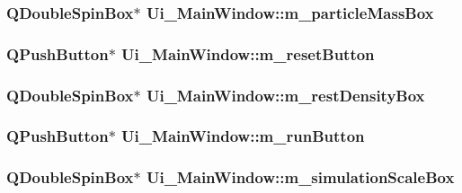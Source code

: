 \label{classUi__MainWindow_a63b4ccd5fefd7242fde139d0ced35e24}
\hypertarget{classUi__MainWindow_a7e35e693ba29d63bbcd1d01556282798}{
\subsubsection[{m\_\-particleMassBox}]{\setlength{\rightskip}{0pt plus 5cm}QDoubleSpinBox$\ast$ {\bf Ui\_\-MainWindow::m\_\-particleMassBox}}}
\label{classUi__MainWindow_a7e35e693ba29d63bbcd1d01556282798}
\hypertarget{classUi__MainWindow_a5caf92edd8ee08153a3d67dd2718429e}{
\subsubsection[{m\_\-resetButton}]{\setlength{\rightskip}{0pt plus 5cm}QPushButton$\ast$ {\bf Ui\_\-MainWindow::m\_\-resetButton}}}
\label{classUi__MainWindow_a5caf92edd8ee08153a3d67dd2718429e}
\hypertarget{classUi__MainWindow_a7ff20accfdc12db98eeeceaf1bd145b4}{
\subsubsection[{m\_\-restDensityBox}]{\setlength{\rightskip}{0pt plus 5cm}QDoubleSpinBox$\ast$ {\bf Ui\_\-MainWindow::m\_\-restDensityBox}}}
\label{classUi__MainWindow_a7ff20accfdc12db98eeeceaf1bd145b4}
\hypertarget{classUi__MainWindow_a4c6abf58735917e5f2a72face76cbc41}{
\subsubsection[{m\_\-runButton}]{\setlength{\rightskip}{0pt plus 5cm}QPushButton$\ast$ {\bf Ui\_\-MainWindow::m\_\-runButton}}}
\label{classUi__MainWindow_a4c6abf58735917e5f2a72face76cbc41}
\hypertarget{classUi__MainWindow_a223abe14980fe1049e3bbdf0ed376a0a}{
\subsubsection[{m\_\-simulationScaleBox}]{\setlength{\rightskip}{0pt plus 5cm}QDoubleSpinBox$\ast$ {\bf Ui\_\-MainWindow::m\_\-simulationScaleBox}}}
